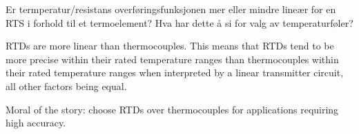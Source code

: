 


Er termperatur/resistans overf{\o}ringsfunksjonen mer eller mindre line{\ae}r for en RTS i forhold til et termoelement? Hva har dette {\aa} si for valg av temperaturf{\o}ler?







RTDs are more linear than thermocouples.  This means that RTDs tend to be more precise within their rated temperature ranges than thermocouples within their rated temperature ranges when interpreted by a linear transmitter circuit, all other factors being equal. 







Moral of the story: choose RTDs over thermocouples for applications requiring high accuracy.




